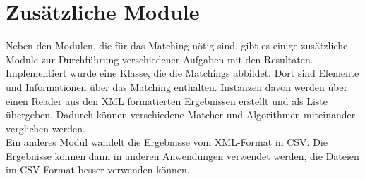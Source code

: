 		\section{Zusätzliche Module}
		Neben den Modulen, die für das Matching nötig sind, gibt es einige zusätzliche
		Module zur Durchführung verschiedener Aufgaben mit den Resultaten.\\
		Implementiert wurde eine Klasse, die die Matchings abbildet. Dort sind
		Elemente und Informationen über das Matching enthalten. Instanzen davon werden
		über einen Reader aus den XML formatierten Ergebnissen erstellt und als Liste
		übergeben. Dadurch können verschiedene Matcher und Algorithmen miteinander
		verglichen werden.\\
		Ein anderes Modul wandelt die Ergebnisse vom XML-Format in CSV. Die Ergebnisse
		können dann in anderen Anwendungen verwendet werden, die Dateien im CSV-Format
		besser verwenden können.